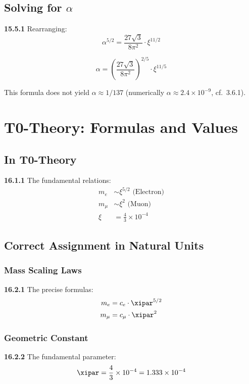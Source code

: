 \subsection{Solving for $\alpha$}

\noindent \textbf{15.5.1} Rearranging:
\[
\alpha^{5/2} = \frac{27\sqrt{3}}{8\pi^2} \cdot \xi^{11/2}
\]

\[
\alpha = \left(\frac{27\sqrt{3}}{8\pi^2}\right)^{2/5} \cdot \xi^{11/5}
\]

This formula does not yield $\alpha \approx 1/137$ (numerically $\alpha \approx 2.4\times10^{-9}$, cf.\ 3.6.1).


\section{T0-Theory: Formulas and Values}

\subsection{In T0-Theory}

\noindent \textbf{16.1.1} The fundamental relations:
\begin{align}
	m_e &\sim \xi^{5/2} \text{ (Electron)} \\
	m_\mu &\sim \xi^2 \text{ (Muon)} \\
	\xi &= \frac{4}{3} \times 10^{-4} 
\end{align}

\subsection{Correct Assignment in Natural Units}

\subsubsection{Mass Scaling Laws}
\noindent \textbf{16.2.1} The precise formulas:
\begin{align}
	m_e &= c_e \cdot \xipar^{5/2} \\
	m_\mu &= c_\mu \cdot \xipar^2
\end{align}

\subsubsection{Geometric Constant}
\noindent \textbf{16.2.2} The fundamental parameter:
\begin{equation}
	\xipar = \frac{4}{3} \times 10^{-4} = 1.333 \times 10^{-4}
\end{equation}

